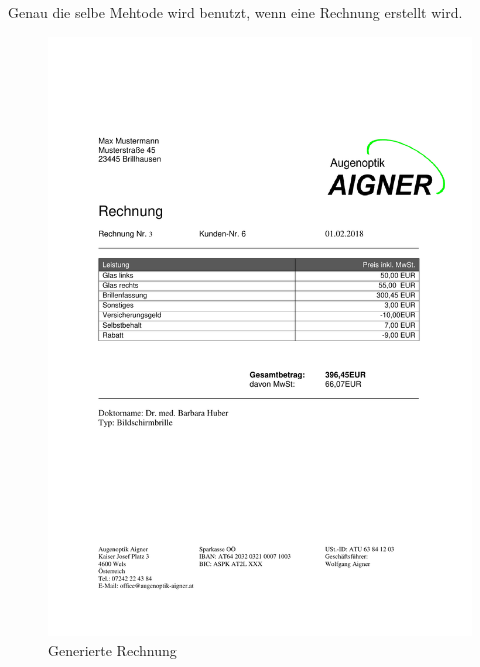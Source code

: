 Genau die selbe Mehtode wird benutzt, wenn eine Rechnung erstellt wird.
\begin{figure}[H]
\begin{center}
	\includegraphics[scale=.75]{images/Musterrechnung.pdf}
\end{center}
	\caption{Generierte Rechnung}
	\label{fig:sample}
\end{figure}
